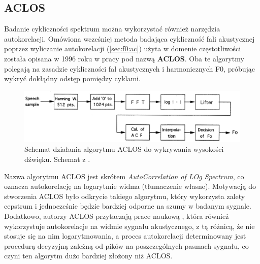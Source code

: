 \documentclass[12pt,a4paper,twoside]{mwart}
\begin{document}
\subsection{ACLOS}\label{sec:f0:aclos}
Badanie cykliczności spektrum można wykorzystać również narzędzia autokorelacji. Omówiona wcześniej metoda badająca cykliczność fali akustycznej poprzez wyliczanie autokorelacji (\ref{sec:f0:ac}) użyta w domenie częstotliwości została opisana w 1996 roku w pracy \cite{Transcription:Kunieda:Aclos} pod nazwą \textbf{ACLOS}. Oba te algorytmy polegają na zasadzie cykliczności fal akustycznych i harmonicznych F0, próbując wykryć dokłądny odstęp pomiędzy cyklami.

\begin{figure}[H]
  \begin{center}
    \includegraphics[scale=0.29]{images/ACLOS/ACLOS_flow.jpg}
    \caption{Schemat działania algorytmu ACLOS do wykrywania wysokości dźwięku. Schemat z 
    \cite[233]{Transcription:Kunieda:Aclos}
    .}
    \label{fig:aclos:flow}
  \end{center}
\end{figure}

Nazwa algorytmu ACLOS jest skrótem \textit{AutoCorrelation of LOg Spectrum}, co oznacza autokorelację na logarytmie widma (tłumaczenie własne). Motywacją do stworzenia ACLOS było odkrycie takiego algorytmu, który wykorzysta zalety cepstrum i jednocześnie będzie bardziej odporne na szumy w badanym sygnale. Dodatkowo, autorzy ACLOS przytaczają prace naukową \cite{Transcription:Lahat:SpectralAutocorrelationNoiseCorrupted}, która również wykorzystuje autokorelacje na widmie sygnału akustycznego, z tą różnicą, że nie stosuje się na nim logarytmowania, a proces autokorelacji determinowany jest procedurą decyzyjną zależną od pików na poszczególnych pasmach sygnału, co czyni ten algorytm dużo bardziej złożony niż ACLOS.
\end{document}
